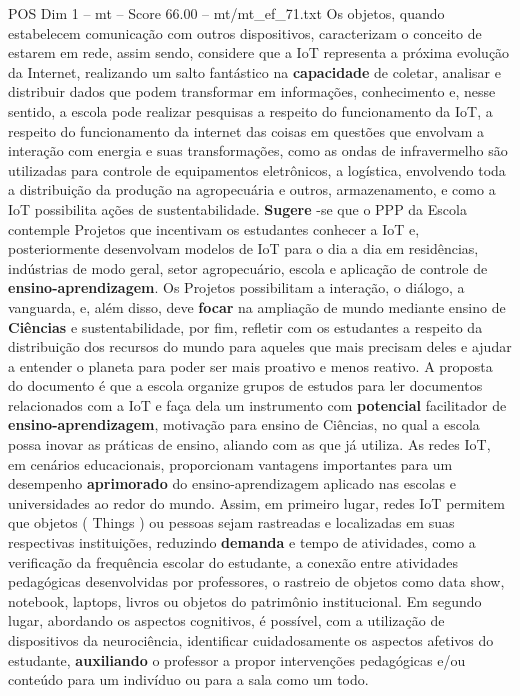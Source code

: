 \begin{textsample}{POS Dim 1 – mt – Score 66.00 – mt/mt\_ef\_71.txt}
Os objetos, quando estabelecem comunicação com outros dispositivos, caracterizam o conceito de estarem em rede, assim sendo, considere que a IoT representa a próxima evolução da Internet, realizando um salto fantástico na \textbf{capacidade} de coletar, analisar e distribuir dados que podem transformar em informações, conhecimento e, nesse sentido, a escola pode realizar pesquisas a respeito do funcionamento da IoT, a respeito do funcionamento da internet das coisas em questões que envolvam a interação com energia e suas transformações, como as ondas de infravermelho são utilizadas para controle de equipamentos eletrônicos, a logística, envolvendo toda a distribuição da produção na agropecuária e outros, armazenamento, e como a IoT possibilita ações de sustentabilidade. \textbf{Sugere} -se que o PPP da Escola contemple Projetos que incentivam os estudantes conhecer a IoT e, posteriormente desenvolvam modelos de IoT para o dia a dia em residências, indústrias de modo geral, setor agropecuário, escola e aplicação de controle de \textbf{ensino-aprendizagem}.
Os Projetos possibilitam a interação, o diálogo, a vanguarda, e, além disso, deve \textbf{focar} na ampliação de mundo mediante ensino de \textbf{Ciências} e sustentabilidade, por fim, refletir com os estudantes a respeito da distribuição dos recursos do mundo para aqueles que mais precisam deles e ajudar a entender o planeta para poder ser mais proativo e menos reativo.
A proposta do documento é que a escola organize grupos de estudos para ler documentos relacionados com a IoT e faça dela um instrumento com \textbf{potencial} facilitador de \textbf{ensino-aprendizagem}, motivação para ensino de Ciências, no qual a escola possa inovar as práticas de ensino, aliando com as que já utiliza.
As redes IoT, em cenários educacionais, proporcionam vantagens importantes para um desempenho \textbf{aprimorado} do ensino-aprendizagem aplicado nas escolas e universidades ao redor do mundo.
Assim, em primeiro lugar, redes IoT permitem que objetos ( Things ) ou pessoas sejam rastreadas e localizadas em suas respectivas instituições, reduzindo \textbf{demanda} e tempo de atividades, como a verificação da frequência escolar do estudante, a conexão entre atividades pedagógicas desenvolvidas por professores, o rastreio de objetos como data show, notebook, laptops, livros ou objetos do patrimônio institucional.
Em segundo lugar, abordando os aspectos cognitivos, é possível, com a utilização de dispositivos da neurociência, identificar cuidadosamente os aspectos afetivos do estudante, \textbf{auxiliando} o professor a propor intervenções pedagógicas e/ou conteúdo para um indivíduo ou para a sala como um todo.

\end{textsample}

